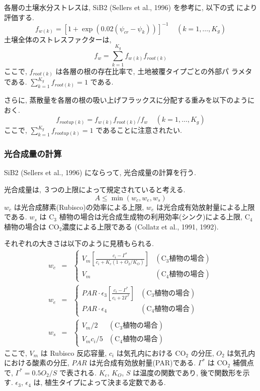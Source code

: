 各層の土壌水分ストレスは, SiB2 (Sellers et al., 1996) を参考に, 以下の式
により評価する. 
\begin{equation}
 f_{w(k)} = [ 1 + \exp( 0.02 (\psi_{cr} - \psi_{k}) ) ]^{-1}
\ \ \ \ \ (k=1,\ldots,K_g)
\end{equation}
土壌全体のストレスファクターは, 
\begin{equation}
 f_w = \sum_{k=1}^{K_g} f_{w(k)} f_{root(k)}
\end{equation}
ここで, $f_{root(k)}$ は各層の根の存在比率で, 土地被覆タイプごとの外部パ
ラメタである. $\sum_{k=1}^{K_g} f_{root(k)}=1$ である. 

さらに, 蒸散量を各層の根の吸い上げフラックスに分配する重みを以下のように
おく. 
\begin{equation}
 f_{rootup(k)} = f_{w(k)} f_{root(k)} / f_w 
\ \ \ \ \ (k=1,\ldots,K_g)
\end{equation}
ここで, $\sum_{k=1}^{K_g} f_{rootup(k)} = 1$ であることに注意されたい. 

\subsubsection{光合成量の計算}

SiB2 (Sellers et al., 1996) にならって, 光合成量の計算を行う. 

光合成量は, ３つの上限によって規定されていると考える. 
\begin{equation}
 A \leq \min( w_c, w_e, w_s) \label{photo_a}
\end{equation}
$w_c$ は光合成酵素(Rubisco)の効率による上限, 
$w_e$ は光合成有効放射量による上限である. 
$w_s$ は C$_3$ 植物の場合は光合成生成物の利用効率(シンク)による上限, 
C$_4$ 植物の場合は CO$_2$濃度による上限である
(Collatz et al., 1991, 1992). 

それぞれの大きさは以下のように見積もられる. 
\begin{eqnarray}
 w_c &=& \left\{
\begin{array}{ll}
\displaystyle{ 
V_m \left[ \frac{c_i - \Gamma^*}{c_i + K_c(1+O_2/K_O)}\right]
}
 & (\mbox{C$_3$植物の場合})\\
 V_m 
 & (\mbox{C$_4$植物の場合})
\end{array}
\right. \\
 w_e &=& \left\{
\begin{array}{ll}
\displaystyle{ 
PAR\cdot \epsilon_3 \left[ \frac{c_i-\Gamma^*}{c_i+2\Gamma^*}\right]
}
 & (\mbox{C$_3$植物の場合})\\
PAR\cdot \epsilon_4 
 & (\mbox{C$_4$植物の場合})
\end{array}
\right. \\
 w_s &=& \left\{
\begin{array}{ll}
V_m / 2
 & (\mbox{C$_3$植物の場合})\\
V_m c_i/ 5
 & (\mbox{C$_4$植物の場合})
\end{array}
\right.
\end{eqnarray}
ここで, $V_m$ は Rubisco 反応容量, $c_i$ は気孔内における CO$_2$ の分圧,
$O_2$ は気孔内における酸素の分圧, $PAR$ は光合成有効放射量(PAR)である. 
$\Gamma^*$ は CO$_2$ 補償点で, $\Gamma^* = 0.5 O_2 / S$ で表される. 
$K_c$, $K_O$, $S$ は温度の関数であり, 後で関数形を示す. 
$\epsilon_3$, $\epsilon_4$ は, 植生タイプによって決まる定数である. 

